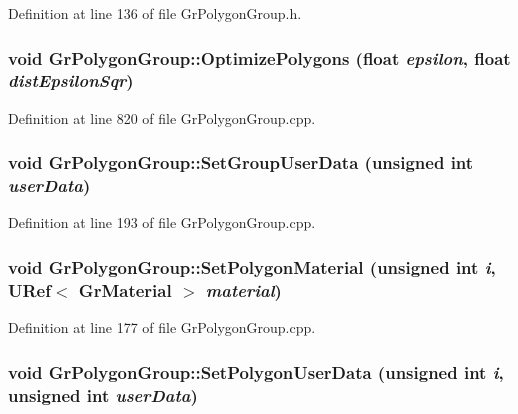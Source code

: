 Definition at line 136 of file GrPolygonGroup.h.\hypertarget{class_gr_polygon_group_887ed72b43c9832341bd9059fb43d123}{
\subsubsection[{OptimizePolygons}]{\setlength{\rightskip}{0pt plus 5cm}void GrPolygonGroup::OptimizePolygons (float {\em epsilon}, \/  float {\em distEpsilonSqr})}}
\label{class_gr_polygon_group_887ed72b43c9832341bd9059fb43d123}




Definition at line 820 of file GrPolygonGroup.cpp.\hypertarget{class_gr_polygon_group_4385ad81ad1653c24b7a5a18018bb7a5}{
\subsubsection[{SetGroupUserData}]{\setlength{\rightskip}{0pt plus 5cm}void GrPolygonGroup::SetGroupUserData (unsigned int {\em userData})}}
\label{class_gr_polygon_group_4385ad81ad1653c24b7a5a18018bb7a5}




Definition at line 193 of file GrPolygonGroup.cpp.\hypertarget{class_gr_polygon_group_cc582187546be8c5c3d412c5980a9029}{
\subsubsection[{SetPolygonMaterial}]{\setlength{\rightskip}{0pt plus 5cm}void GrPolygonGroup::SetPolygonMaterial (unsigned int {\em i}, \/  {\bf URef}$<$ {\bf GrMaterial} $>$ {\em material})}}
\label{class_gr_polygon_group_cc582187546be8c5c3d412c5980a9029}




Definition at line 177 of file GrPolygonGroup.cpp.\hypertarget{class_gr_polygon_group_011cfe165e7b23f6b1a3710e63be95ec}{
\subsubsection[{SetPolygonUserData}]{\setlength{\rightskip}{0pt plus 5cm}void GrPolygonGroup::SetPolygonUserData (unsigned int {\em i}, \/  unsigned int {\em userData})}}
\label{class_gr_polygon_group_011cfe165e7b23f6b1a3710e63be95ec}





